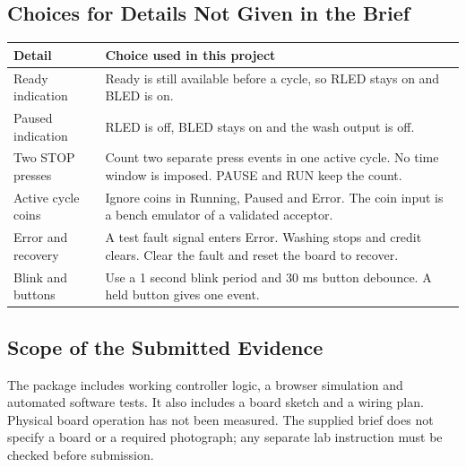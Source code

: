 \subsection{Choices for Details Not Given in the Brief}
\begin{tabularx}{\linewidth}{@{}p{3.15cm}Y@{}}
\toprule
Detail & Choice used in this project\\
\midrule
Ready indication & Ready is still available before a cycle, so RLED stays on and BLED is on.\\
Paused indication & RLED is off, BLED stays on and the wash output is off.\\
Two STOP presses & Count two separate press events in one active cycle. No time window is imposed. PAUSE and RUN keep the count.\\
Active cycle coins & Ignore coins in Running, Paused and Error. The coin input is a bench emulator of a validated acceptor.\\
Error and recovery & A test fault signal enters Error. Washing stops and credit clears. Clear the fault and reset the board to recover.\\
Blink and buttons & Use a 1 second blink period and 30 ms button debounce. A held button gives one event.\\
\bottomrule
\end{tabularx}

\subsection{Scope of the Submitted Evidence}
The package includes working controller logic, a browser simulation and automated
software tests. It also includes a board sketch and a wiring plan. Physical board
operation has not been measured. The supplied brief does not specify a board or
a required photograph; any separate lab instruction must be checked before submission.
